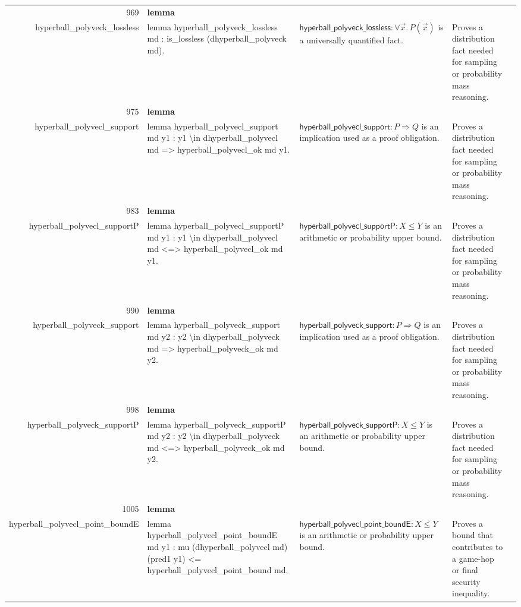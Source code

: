 \documentclass[10pt]{article}
\newcommand{\ec}[1]{\begingroup\ttfamily\scriptsize #1\endgroup}
\begin{document}
\begin{longtable}{r L{0.17\textwidth} L{0.26\textwidth} L{0.27\textwidth} L{0.20\textwidth}}
969 & \textbf{lemma}\\\ec{hyperball\_polyveck\_lossless} & \ec{lemma hyperball\_polyveck\_lossless md : is\_lossless (dhyperball\_polyveck md).} & \(\mathsf{hyperball\_polyveck\_lossless} : \forall \vec{x}.\, P(\vec{x})\) is a universally quantified fact. & Proves a distribution fact needed for sampling or probability mass reasoning. \\
975 & \textbf{lemma}\\\ec{hyperball\_polyvecl\_support} & \ec{lemma hyperball\_polyvecl\_support md y1 : y1 \textbackslash{}in dhyperball\_polyvecl md => hyperball\_polyvecl\_ok md y1.} & \(\mathsf{hyperball\_polyvecl\_support} : P \Rightarrow Q\) is an implication used as a proof obligation. & Proves a distribution fact needed for sampling or probability mass reasoning. \\
983 & \textbf{lemma}\\\ec{hyperball\_polyvecl\_supportP} & \ec{lemma hyperball\_polyvecl\_supportP md y1 : y1 \textbackslash{}in dhyperball\_polyvecl md <=> hyperball\_polyvecl\_ok md y1.} & \(\mathsf{hyperball\_polyvecl\_supportP} : X \le Y\) is an arithmetic or probability upper bound. & Proves a distribution fact needed for sampling or probability mass reasoning. \\
990 & \textbf{lemma}\\\ec{hyperball\_polyveck\_support} & \ec{lemma hyperball\_polyveck\_support md y2 : y2 \textbackslash{}in dhyperball\_polyveck md => hyperball\_polyveck\_ok md y2.} & \(\mathsf{hyperball\_polyveck\_support} : P \Rightarrow Q\) is an implication used as a proof obligation. & Proves a distribution fact needed for sampling or probability mass reasoning. \\
998 & \textbf{lemma}\\\ec{hyperball\_polyveck\_supportP} & \ec{lemma hyperball\_polyveck\_supportP md y2 : y2 \textbackslash{}in dhyperball\_polyveck md <=> hyperball\_polyveck\_ok md y2.} & \(\mathsf{hyperball\_polyveck\_supportP} : X \le Y\) is an arithmetic or probability upper bound. & Proves a distribution fact needed for sampling or probability mass reasoning. \\
1005 & \textbf{lemma}\\\ec{hyperball\_polyvecl\_point\_boundE} & \ec{lemma hyperball\_polyvecl\_point\_boundE md y1 : mu (dhyperball\_polyvecl md) (pred1 y1) <= hyperball\_polyvecl\_point\_bound md.} & \(\mathsf{hyperball\_polyvecl\_point\_boundE} : X \le Y\) is an arithmetic or probability upper bound. & Proves a bound that contributes to a game-hop or final security inequality. \\

\end{longtable}
\end{document}
